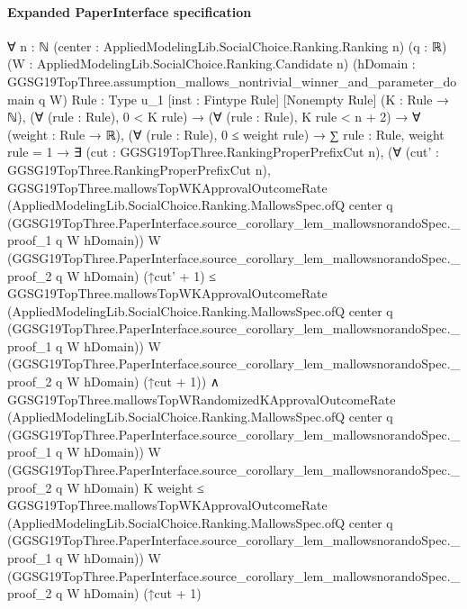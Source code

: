 \documentclass[10pt]{article}
\begin{document}
\paragraph{Expanded PaperInterface specification}
\begin{ReviewVerbatim}
∀ {n : ℕ} (center : AppliedModelingLib.SocialChoice.Ranking.Ranking n) (q : ℝ)
  (W : AppliedModelingLib.SocialChoice.Ranking.Candidate n)
  (hDomain : GGSG19TopThree.assumption_mallows_nontrivial_winner_and_parameter_domain q W) {Rule : Type u_1}
  [inst : Fintype Rule] [Nonempty Rule] (K : Rule → ℕ),
  (∀ (rule : Rule), 0 < K rule) →
    (∀ (rule : Rule), K rule < n + 2) →
      ∀ (weight : Rule → ℝ),
        (∀ (rule : Rule), 0 ≤ weight rule) →
          ∑ rule : Rule, weight rule = 1 →
            ∃ (cut : GGSG19TopThree.RankingProperPrefixCut n),
              (∀ (cut' : GGSG19TopThree.RankingProperPrefixCut n),
                  GGSG19TopThree.mallowsTopWKApprovalOutcomeRate
                      (AppliedModelingLib.SocialChoice.Ranking.MallowsSpec.ofQ center q
                        (GGSG19TopThree.PaperInterface.source_corollary_lem_mallowsnorandoSpec._proof_1 q W hDomain))
                      W (GGSG19TopThree.PaperInterface.source_corollary_lem_mallowsnorandoSpec._proof_2 q W hDomain)
                      (↑cut' + 1) ≤
                    GGSG19TopThree.mallowsTopWKApprovalOutcomeRate
                      (AppliedModelingLib.SocialChoice.Ranking.MallowsSpec.ofQ center q
                        (GGSG19TopThree.PaperInterface.source_corollary_lem_mallowsnorandoSpec._proof_1 q W hDomain))
                      W (GGSG19TopThree.PaperInterface.source_corollary_lem_mallowsnorandoSpec._proof_2 q W hDomain)
                      (↑cut + 1)) ∧
                GGSG19TopThree.mallowsTopWRandomizedKApprovalOutcomeRate
                    (AppliedModelingLib.SocialChoice.Ranking.MallowsSpec.ofQ center q
                      (GGSG19TopThree.PaperInterface.source_corollary_lem_mallowsnorandoSpec._proof_1 q W hDomain))
                    W (GGSG19TopThree.PaperInterface.source_corollary_lem_mallowsnorandoSpec._proof_2 q W hDomain) K
                    weight ≤
                  GGSG19TopThree.mallowsTopWKApprovalOutcomeRate
                    (AppliedModelingLib.SocialChoice.Ranking.MallowsSpec.ofQ center q
                      (GGSG19TopThree.PaperInterface.source_corollary_lem_mallowsnorandoSpec._proof_1 q W hDomain))
                    W (GGSG19TopThree.PaperInterface.source_corollary_lem_mallowsnorandoSpec._proof_2 q W hDomain)
                    (↑cut + 1)
\end{ReviewVerbatim}
\end{document}
